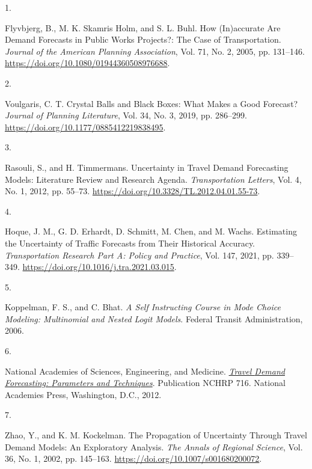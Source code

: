 \documentclass[
  letterpaper,
]{trb}
\newlength{\cslhangindent}
\newlength{\csllabelwidth}
\newlength{\cslentryspacingunit} %
\newenvironment{CSLReferences}[2] %
 {%
  \setlength{\parindent}{0pt}
  \ifodd #1
  \let\oldpar\par
  \def\par{\hangindent=\cslhangindent\oldpar}
  \fi
  \setlength{\parskip}{#2\cslentryspacingunit}
 }%
 {}
\newcommand{\CSLLeftMargin}[1]{\parbox[t]{\csllabelwidth}{#1}}
\newcommand{\CSLRightInline}[1]{\parbox[t]{\linewidth - \csllabelwidth}{#1}\break}
\begin{document}

\hypertarget{refs}{}
\begin{CSLReferences}{0}{0}
\leavevmode{}%
\CSLLeftMargin{1. }%
\CSLRightInline{Flyvbjerg, B., M. K. Skamris Holm, and S. L. Buhl. How
({In})accurate {Are Demand Forecasts} in {Public Works Projects}?: {The
Case} of {Transportation}. \emph{Journal of the American Planning
Association}, Vol. 71, No. 2, 2005, pp. 131--146.
\url{https://doi.org/10.1080/01944360508976688}.}

\leavevmode{}%
\CSLLeftMargin{2. }%
\CSLRightInline{Voulgaris, C. T. Crystal {Balls} and {Black Boxes}:
{What Makes} a {Good Forecast}? \emph{Journal of Planning Literature},
Vol. 34, No. 3, 2019, pp. 286--299.
\url{https://doi.org/10.1177/0885412219838495}.}

\leavevmode{}%
\CSLLeftMargin{3. }%
\CSLRightInline{Rasouli, S., and H. Timmermans. Uncertainty in Travel
Demand Forecasting Models: Literature Review and Research Agenda.
\emph{Transportation Letters}, Vol. 4, No. 1, 2012, pp. 55--73.
\url{https://doi.org/10.3328/TL.2012.04.01.55-73}.}

\leavevmode{}%
\CSLLeftMargin{4. }%
\CSLRightInline{Hoque, J. M., G. D. Erhardt, D. Schmitt, M. Chen, and M.
Wachs. Estimating the Uncertainty of Traffic Forecasts from Their
Historical Accuracy. \emph{Transportation Research Part A: Policy and
Practice}, Vol. 147, 2021, pp. 339--349.
\url{https://doi.org/10.1016/j.tra.2021.03.015}.}

\leavevmode{}%
\CSLLeftMargin{5. }%
\CSLRightInline{Koppelman, F. S., and C. Bhat. \emph{A {Self Instructing
Course} in {Mode Choice Modeling}: {Multinomial} and {Nested Logit
Models}}. {Federal Transit Administration}, 2006.}

\leavevmode{}%
\CSLLeftMargin{6. }%
\CSLRightInline{National Academies of Sciences, Engineering, and
Medicine. \emph{\href{https://doi.org/10.17226/14665}{Travel {Demand
Forecasting}: {Parameters} and {Techniques}}}. Publication NCHRP 716.
{National Academies Press}, {Washington, D.C.}, 2012.}

\leavevmode{}%
\CSLLeftMargin{7. }%
\CSLRightInline{Zhao, Y., and K. M. Kockelman. The Propagation of
Uncertainty Through Travel Demand Models: {An} Exploratory Analysis.
\emph{The Annals of Regional Science}, Vol. 36, No. 1, 2002, pp.
145--163. \url{https://doi.org/10.1007/s001680200072}.}


\end{CSLReferences}
\end{document}
